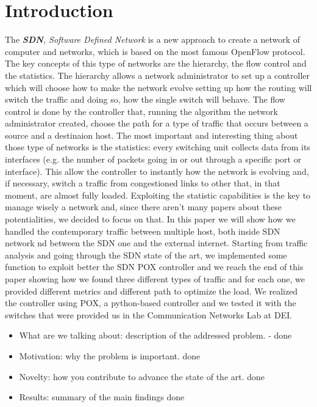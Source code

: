 \documentclass[conference,10pt]{IEEEtran}
\begin{document}
\section{Introduction}\label{sec:intro}
The \textit{\textbf{SDN}, Software Defined Network} is a new approach to create a network of computer and networks, which is based on the
most famous OpenFlow protocol. The key concepts of this type of networks are the hierarchy, the flow control and the statistics.
The hierarchy allows a network administrator to set up a controller which will choose how to make the network evolve setting up
how the routing will switch the traffic and doing so, how the single switch will behave.
The flow control is done by the controller that, running the algorithm the network administrator created, choose the path for a
type of traffic that occurs between a source and a destinaion host.
The most important and interesting thing about those type of networks is the statistics: every switching unit collects data from its
interfaces (e.g. the number of packets going in or out through a specific port or interface). This allow the controller to instantly
how the network is evolving and, if necessary, switch a traffic from congestioned links to other that, in that moment, are almost fully loaded.
Exploiting the statistic capabilities is the key to manage wisely a network and, since there aren't many papers about these potentialities,
we decided to focus on that. In this paper we will show how we handled the contemporary traffic between multiple host, both inside SDN network
nd between the SDN one and the external internet. Starting from traffic analysis and going through the SDN state of the art, we implemented some function
to exploit better the SDN POX controller and we reach the end of this paper showing how we found three different types of traffic and
for each one, we provided different metrics and different path to optimize the load. We realized the controller using POX, a python-based controller
and we tested it with the switches that were provided us in the Communication Networks Lab at DEI.
\begin{itemize}
	\item What are we talking about: description of the addressed problem. - done 
\item Motivation: why the problem is important. done
\item Novelty: how you contribute to advance the state of the art. done
\item Results: summary of the main findings  done
\end{itemize}
\end{document}
